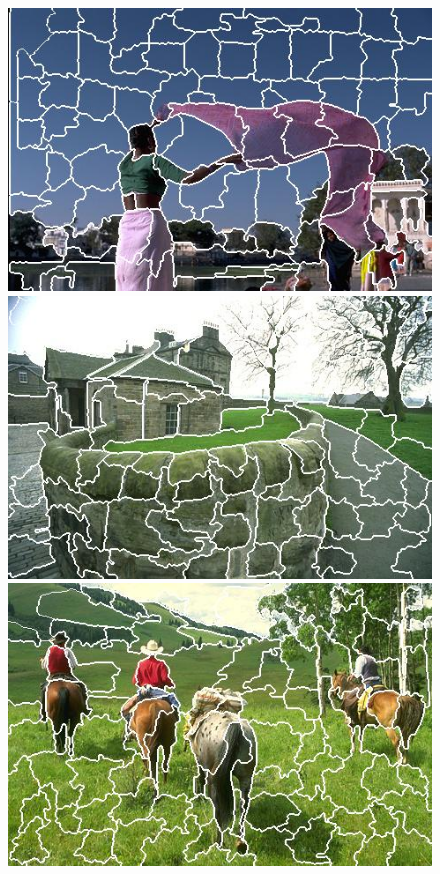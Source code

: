 \begin{figure}[h]
{\begin{minipage}[b]{0.13\linewidth}
\includegraphics[width=1\linewidth]{figures/img/WT/WT_80085.jpg}
\includegraphics[width=1\linewidth]{figures/img/WT/WT_92014.jpg}
\includegraphics[width=1\linewidth]{figures/img/WT/WT_220003.jpg}

\end{minipage}}
\end{figure}
